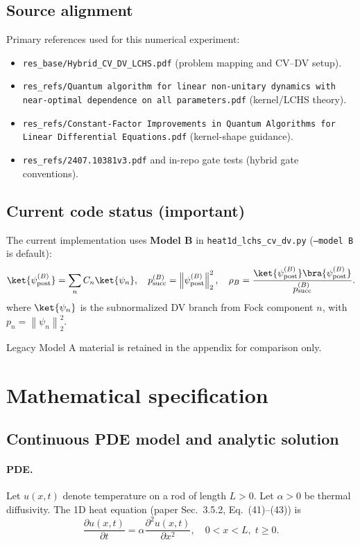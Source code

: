 \documentclass[11pt]{article}
\newcommand{\norm}[1]{\left\lVert #1 \right\rVert}
\begin{document}
\subsection*{Source alignment}
Primary references used for this numerical experiment:
\begin{itemize}[itemsep=2pt,topsep=2pt]
\item \texttt{res\_base/Hybrid\_CV\_DV\_LCHS.pdf} (problem mapping and CV--DV setup).
\item \texttt{res\_refs/Quantum algorithm for linear non-unitary dynamics with near-optimal dependence on all parameters.pdf} (kernel/LCHS theory).
\item \texttt{res\_refs/Constant-Factor Improvements in Quantum Algorithms for Linear Differential Equations.pdf} (kernel-shape guidance).
\item \texttt{res\_refs/2407.10381v3.pdf} and in-repo gate tests (hybrid gate conventions).
\end{itemize}

\subsection*{Current code status (important)}
The current implementation uses \textbf{Model B} in \texttt{heat1d\_lchs\_cv\_dv.py}
(\texttt{--model B} is default):
\[
\ket{\psi_{\mathrm{post}}^{(B)}}=\sum_n C_n\ket{\psi_n},\quad
p_{\mathrm{succ}}^{(B)}=\norm{\psi_{\mathrm{post}}^{(B)}}_2^2,\quad
\rho_B=\frac{\ket{\psi_{\mathrm{post}}^{(B)}}\bra{\psi_{\mathrm{post}}^{(B)}}}{p_{\mathrm{succ}}^{(B)}}.
\]
where \(\ket{\psi_n}\) is the subnormalized DV branch from Fock component \(n\), with
\(p_n=\norm{\psi_n}_2^2\).

Legacy Model A material is retained in the appendix for comparison only.

\section{Mathematical specification}

\subsection{Continuous PDE model and analytic solution}

\paragraph{PDE.}
Let $u(x,t)$ denote temperature on a rod of length $L>0$. Let $\alpha>0$ be thermal diffusivity.
The 1D heat equation (paper Sec.~3.5.2, Eq.~(41)--(43)) is
\begin{equation}
\frac{\partial u(x,t)}{\partial t} = \alpha \frac{\partial^2 u(x,t)}{\partial x^2}, \quad 0<x<L,\; t\ge 0.
\end{equation}
\end{document}
